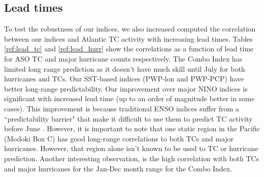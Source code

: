 \documentclass[]{article}
\begin{document}
\subsection{Lead times}
To test the robustness of our indices, we also increased computed the correlation between our indices and Atlantic TC activity with increasing lead times. Tables \ref{ref:lead_tc} and  \ref{ref:lead_hurr} show the correlations as a function of lead time for ASO TC and major hurricane counts respectively. The Combo Index has limited long range prediction as it doesn't have much skill until July for both hurricanes and TCs. Our SST-based indices (PWP-lon and PWP-PCP) have better long-range predictability. Our improvement over major NINO indices is significant with increased lead time (up to an order of magnitude better in some cases). This improvement is because traditional ENSO indices suffer from a ``predictability barrier" that make it difficult to use them to predict TC activity before June \cite{webster1992}. However, it is important to note that one static region in the Pacific (Modoki Box C) has good long-range correlations to both TCs and major hurricanes. However, that region alone isn't known to be used to TC or hurricane prediction. Another interesting observation, is the high correlation with both TCs and major hurricanes for the Jan-Dec month range for the Combo Index.
\end{document}
